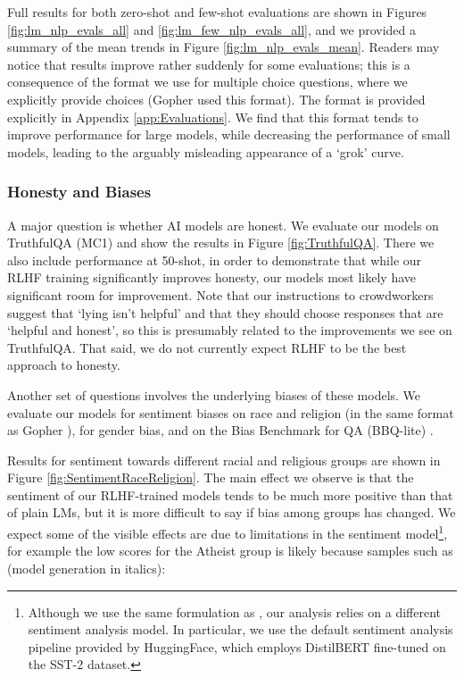 Full results for both zero-shot and few-shot evaluations are shown in Figures \ref{fig:lm_nlp_evals_all} and \ref{fig:lm_few_nlp_evals_all}, and we provided a summary of the mean trends in Figure \ref{fig:lm_nlp_evals_mean}.  Readers may notice that results improve rather suddenly for some evaluations; this is a consequence of the format we use for multiple choice questions, where we explicitly provide choices (Gopher \cite{Gopher} used this format).  The format is provided explicitly in Appendix \ref{app:Evaluations}.  We find that this format tends to improve performance for large models, while decreasing the performance of small models, leading to the arguably misleading appearance of a `grok' \cite{Grok} curve.

\subsubsection{Honesty and Biases}
\label{sec:HonestyAndBiases}

A major question is whether AI models are honest.  We evaluate our models on TruthfulQA (MC1) \cite{lin2021truthfulqa} and show the results in Figure \ref{fig:TruthfulQA}.  There we also include performance at 50-shot, in order to demonstrate that while our RLHF training significantly improves honesty, our models  most likely have significant room for improvement.  Note that our instructions to crowdworkers suggest that `lying isn't helpful' and that they should choose responses that are `helpful and honest', so this is presumably related to the improvements we see on TruthfulQA.  That said, we do not currently expect RLHF to be the best approach to honesty.

Another set of questions involves the underlying biases of these models.  We evaluate our models for sentiment biases on race and religion (in the same format as Gopher \cite{Gopher}), for gender bias, and on the Bias Benchmark for QA (BBQ-lite) \cite{BBQA}.  

Results for sentiment towards different racial and religious groups are shown in Figure \ref{fig:SentimentRaceReligion}.  The main effect we observe is that the sentiment of our RLHF-trained models tends to be much more positive than that of plain LMs, but it is more difficult to say if bias among groups has changed.  We expect some of the visible effects are due to limitations in the sentiment model\footnote{Although we use the same formulation as , our analysis relies on a different sentiment analysis model. In particular, we use the default sentiment analysis pipeline provided by HuggingFace, which employs DistilBERT  fine-tuned on the SST-2 dataset.}, for example the low scores for the Atheist group is likely because samples such as (model generation in italics):

